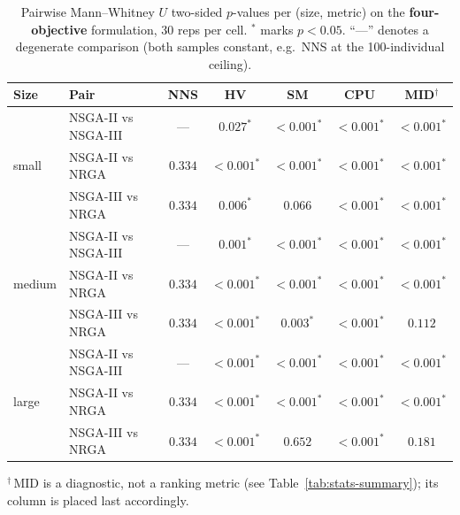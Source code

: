 \documentclass[applsci,article,submit,moreauthors,pdftex]{Definitions/mdpi}
\begin{document}
\begin{table}[!ht]
\centering\footnotesize
\caption{Pairwise Mann--Whitney $U$ two-sided $p$-values per
(size, metric) on the \textbf{four-objective} formulation, 30 reps per
cell. $^{*}$ marks $p<0.05$. ``---'' denotes a degenerate comparison
(both samples constant, e.g.\ NNS at the 100-individual ceiling).}
\label{tab:appb-4obj}
\begin{tabular}{l l ccccc}
\toprule
Size & Pair & NNS & HV & SM & CPU & MID$^{\dagger}$ \\
\midrule
\multirow{3}{*}{small} & NSGA-II vs NSGA-III & --- & $0.027^{*}$ & $<0.001^{*}$ & $<0.001^{*}$ & $<0.001^{*}$ \\
 & NSGA-II vs NRGA & $0.334$ & $<0.001^{*}$ & $<0.001^{*}$ & $<0.001^{*}$ & $<0.001^{*}$ \\
 & NSGA-III vs NRGA & $0.334$ & $0.006^{*}$ & $0.066$ & $<0.001^{*}$ & $<0.001^{*}$ \\
\midrule
\multirow{3}{*}{medium} & NSGA-II vs NSGA-III & --- & $0.001^{*}$ & $<0.001^{*}$ & $<0.001^{*}$ & $<0.001^{*}$ \\
 & NSGA-II vs NRGA & $0.334$ & $<0.001^{*}$ & $<0.001^{*}$ & $<0.001^{*}$ & $<0.001^{*}$ \\
 & NSGA-III vs NRGA & $0.334$ & $<0.001^{*}$ & $0.003^{*}$ & $<0.001^{*}$ & $0.112$ \\
\midrule
\multirow{3}{*}{large} & NSGA-II vs NSGA-III & --- & $<0.001^{*}$ & $<0.001^{*}$ & $<0.001^{*}$ & $<0.001^{*}$ \\
 & NSGA-II vs NRGA & $0.334$ & $<0.001^{*}$ & $<0.001^{*}$ & $<0.001^{*}$ & $<0.001^{*}$ \\
 & NSGA-III vs NRGA & $0.334$ & $<0.001^{*}$ & $0.652$ & $<0.001^{*}$ & $0.181$ \\
\bottomrule
\end{tabular}

\smallskip
{\footnotesize $^{\dagger}$\,MID is a diagnostic, not a ranking metric
(see Table~\ref{tab:stats-summary}); its column is placed last accordingly.}
\end{table}
\end{document}
